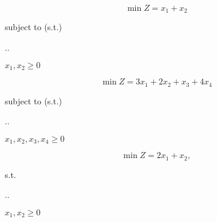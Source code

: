 \begin{frameExample}{}{}
    \[\min Z = x_1 + x_2 \]

  {\centering
    subject to (s.t.)

    \sysdelim..%

    \vspace{5mm}

    $x_1 , x_2 \geq 0$
  \par}
\end{frameExample}


\begin{frameExample}{}{}
    \[\min Z = 3x_1 + 2x_2 + x_3 + 4x_4  \]

  {\centering
    subject to (s.t.)

    \sysdelim..%

    \vspace{5mm}

    $x_1 , x_2, x_3, x_4 \geq 0$
  \par}
\end{frameExample}

\begin{frameExample}{}{}
  \[\min Z = 2x_1 + x_2, \]
  {\centering
    s.t.
    \vspace{3mm}

    \sysdelim..%

    \vspace{4mm}
    $x_1, x_2 \geq 0$
  \par}
 
\end{frameExample}


